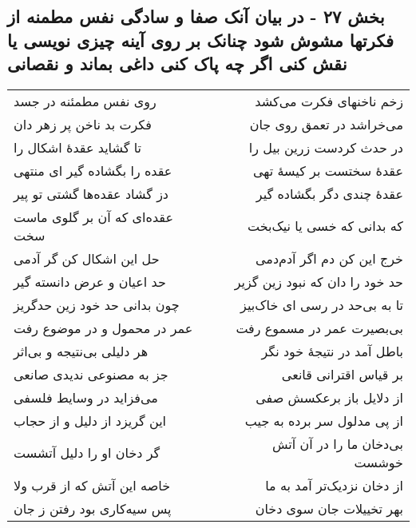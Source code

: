 \begin{center}
\section*{بخش ۲۷ - در بیان آنک صفا و سادگی نفس مطمنه از فکرتها مشوش شود چنانک بر روی آینه چیزی نویسی یا نقش کنی اگر چه پاک کنی داغی بماند و نقصانی}
\label{sec:sh027}
\begin{longtable}{l p{0.5cm} r}
روی نفس مطمئنه در جسد
&&
زخم ناخنهای فکرت می‌کشد
\\
فکرت بد ناخن پر زهر دان
&&
می‌خراشد در تعمق روی جان
\\
تا گشاید عقدهٔ اشکال را
&&
در حدث کردست زرین بیل را
\\
عقده را بگشاده گیر ای منتهی
&&
عقدهٔ سختست بر کیسهٔ تهی
\\
دز گشاد عقده‌ها گشتی تو پیر
&&
عقدهٔ چندی دگر بگشاده گیر
\\
عقده‌ای که آن بر گلوی ماست سخت
&&
که بدانی که خسی یا نیک‌بخت
\\
حل این اشکال کن گر آدمی
&&
خرج این کن دم اگر آدم‌دمی
\\
حد اعیان و عرض دانسته گیر
&&
حد خود را دان که نبود زین گزیر
\\
چون بدانی حد خود زین حدگریز
&&
تا به بی‌حد در رسی ای خاک‌بیز
\\
عمر در محمول و در موضوع رفت
&&
بی‌بصیرت عمر در مسموع رفت
\\
هر دلیلی بی‌نتیجه و بی‌اثر
&&
باطل آمد در نتیجهٔ خود نگر
\\
جز به مصنوعی ندیدی صانعی
&&
بر قیاس اقترانی قانعی
\\
می‌فزاید در وسایط فلسفی
&&
از دلایل باز برعکسش صفی
\\
این گریزد از دلیل و از حجاب
&&
از پی مدلول سر برده به جیب
\\
گر دخان او را دلیل آتشست
&&
بی‌دخان ما را در آن آتش خوشست
\\
خاصه این آتش که از قرب ولا
&&
از دخان نزدیک‌تر آمد به ما
\\
پس سیه‌کاری بود رفتن ز جان
&&
بهر تخییلات جان سوی دخان
\\
\end{longtable}
\end{center}
